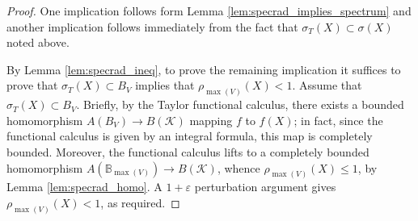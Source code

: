 \documentclass[12pt]{amsart}
\numberwithin{equation}{section}
\theoremstyle{definition}
\newcommand{\cK}{\mathcal{K}}
\newcommand{\bB}{\mathbb{B}}
\begin{document}
\begin{proof}
    One implication follows form Lemma \ref{lem:specrad_implies_spectrum} and another implication follows immediately from the fact that $\sigma_T(X) \subset \sigma(X)$ noted above. 
    
    By Lemma \ref{lem:specrad_ineq}, to prove the remaining implication it suffices to prove that $\sigma_T(X) \subset B_V$ implies that $\rho_{\max(V)}(X) < 1$. Assume that $\sigma_T(X) \subset B_V$. 
    Briefly, by the Taylor functional calculus, there exists a bounded homomorphism $A(B_V) \to B(\cK)$ mapping $f$ to $f(X)$; in fact, since the functional calculus is given by an integral formula, this map is completely bounded. 
    Moreover, the functional calculus lifts to a completely bounded homomorphism $A(\bB_{\max(V)}) \to B(\cK)$, whence $\rho_{\max(V)}(X) \leq 1$, by Lemma \ref{lem:specrad_homo}. A $1+\varepsilon$ perturbation argument gives $\rho_{\max(V)}(X) < 1$, as required.
    

\end{proof}
\end{document}
